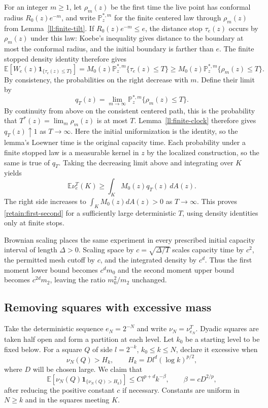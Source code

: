 \documentclass[11pt]{article}
\theoremstyle{definition}
\theoremstyle{remark}
\numberwithin{equation}{section}
\begin{document}
For an integer $m\ge1$, let $\rho_m(z)$ be the first time the live
point has conformal radius $R_0(z)e^{-m}$, and write $\mathbb P_z^{*,m}$ for
the finite centered law through $\rho_m(z)$ from
Lemma~\ref{ll:finite-tilt}.  If $R_0(z)e^{-m}\le e$, the distance stop
$\tau_e(z)$ occurs by $\rho_m(z)$ under this law: Koebe's inequality
gives distance to the boundary at most the conformal radius, and the
initial boundary is farther than $e$.  The finite stopped density
identity therefore gives
\[
 \mathbb E\!\left[W_e(z)\mathbf1_{\{\tau_e(z)\le T\}}\right]
 =M_0(z)\mathbb P_z^{*,m}\{\tau_e(z)\le T\}
 \ge M_0(z)\mathbb P_z^{*,m}\{\rho_m(z)\le T\}.
\]
By consistency, the probabilities on the right decrease with $m$.
Define their limit by
\[
 q_T(z)=\lim_{m\to\infty}
       \mathbb P_z^{*,m}\{\rho_m(z)\le T\}.
\]
By continuity from above on the consistent centered path, this is
the probability that $T^*(z)=\lim_m\rho_m(z)$ is at most $T$.
Lemma~\ref{ll:finite-clock} therefore gives $q_T(z)\uparrow1$ as
$T\to\infty$.  Here the initial uniformization is the identity, so
the lemma's Loewner time is the original capacity time.
Each probability under a finite stopped law is a
measurable kernel in $z$ by the localized construction, so the same
is true of $q_T$.  Taking the decreasing
limit above and integrating over $K$ yields
\[
 \mathbb E\nu_e^T(K)\ge\int_K M_0(z)q_T(z)\,dA(z).
\]
The right side increases to $\int_KM_0(z)dA(z)>0$ as $T\to\infty$.
This proves \eqref{retain:first-second} for a sufficiently large
deterministic $T$, using density identities only at finite stops.

Brownian scaling places the same experiment in every prescribed
initial capacity interval of length $\Delta>0$.  Scaling space by
$c=\sqrt{\Delta/T}$ scales capacity time by $c^2$, the permitted mesh
cutoff by $c$, and the integrated density by $c^d$.  Thus the first
moment lower bound becomes $c^dm_0$ and the second moment upper bound
becomes $c^{2d}m_2$, leaving the ratio $m_0^2/m_2$ unchanged.

\subsection{Removing squares with excessive mass}

Take the deterministic sequence $e_N=2^{-N}$ and write
$\nu_N=\nu_{e_N}^T$.  Dyadic squares are taken half open and form a
partition at each level.  Let $k_0$ be a starting level to be fixed below.  For a
square $Q$ of side $l=2^{-k}$, $k_0\le k\le N$, declare it excessive
when
\[
 \nu_N(Q)>H_k,
 \qquad H_k=D l^d(\log k)^{p/2},
\]
where $D$ will be chosen large.  We claim that
\begin{equation}
 \mathbb E\left[\nu_N(Q)\mathbf1_{\{\nu_N(Q)>H_k\}}\right]
 \le C l^{p+d}k^{-\beta},
 \qquad \beta=cD^{2/p},
 \label{retain:bad-square}
\end{equation}
after reducing the positive constant $c$ if necessary.  Constants
are uniform in $N\ge k$ and in the squares meeting $K$.
\end{document}
